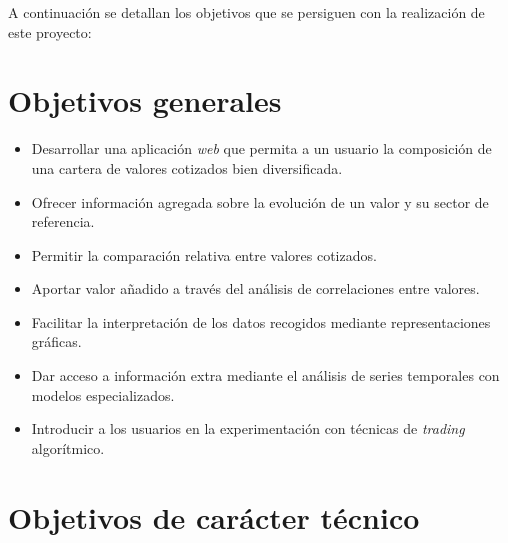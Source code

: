 
A continuación se detallan los objetivos que se persiguen con la realización de este
 proyecto:


\section{Objetivos generales}\label{objetivos_generales}

\begin{itemize}
\tightlist
\item
Desarrollar una aplicación \emph{web} que permita a un usuario la composición
 de una cartera de valores cotizados bien diversificada. 
\item
Ofrecer información agregada sobre la evolución de un valor y su sector
 de referencia. 
\item
Permitir la comparación relativa entre valores cotizados. 
\item
Aportar valor añadido a través del análisis de correlaciones entre valores. 
\item
Facilitar la interpretación de los datos recogidos mediante
 representaciones gráficas.
\item
Dar acceso a información extra mediante el análisis de series temporales con
 modelos especializados. 
\item
Introducir a los usuarios en la experimentación con técnicas de \emph{trading} algorítmico.
\end{itemize}

\section{Objetivos de carácter técnico}\label{objetivos_tecnicos}

